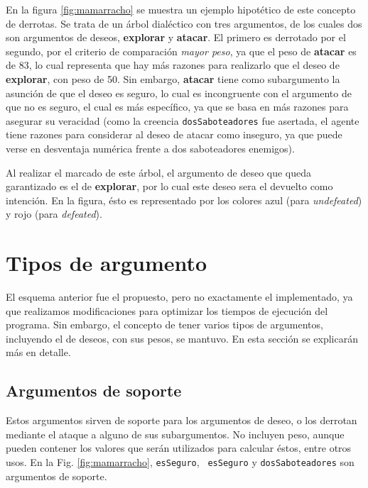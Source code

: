 \documentclass[oneside]{book}
\theoremstyle{definition}
\theoremstyle{example}
\begin{document}
En la figura \ref{fig:mamarracho} se muestra un ejemplo hipotético de este 
concepto de derrotas. Se 
trata de un árbol dialéctico con tres argumentos, de los cuales dos son
argumentos de deseos, \textbf{explorar} y \textbf{atacar}. El primero es
derrotado por el segundo, por el criterio de comparación \textit{mayor peso},
ya que el peso de \textbf{atacar} es de 83, lo cual representa que hay más 
razones para realizarlo que el deseo de \textbf{explorar}, con peso de 50. Sin
embargo, \textbf{atacar} tiene como subargumento la asunción de que el deseo es
seguro, lo cual es incongruente con el argumento de que no es seguro, el cual 
es más específico, ya que se basa en más razones para asegurar su veracidad 
(como la creencia \texttt{dosSaboteadores} fue asertada, el agente tiene 
razones para considerar al deseo de atacar como inseguro, ya que puede verse
en desventaja numérica frente a dos saboteadores enemigos).

Al realizar el marcado de este árbol, el argumento de deseo que queda 
garantizado es el de \textbf{explorar}, por lo cual este deseo sera el devuelto
como intención. En la figura, ésto es representado por los colores azul (para
\textit{undefeated}) y rojo (para \textit{defeated}).


\section{Tipos de argumento}

\label{sec:tiposArgumento}


El esquema anterior fue el propuesto, pero no exactamente el implementado, ya que
realizamos modificaciones para optimizar los tiempos de ejecución del programa. Sin 
embargo, el concepto de tener varios tipos de argumentos, incluyendo el de deseos, con sus
pesos, se mantuvo. En esta sección se explicarán más en detalle.

\subsection{Argumentos de soporte}

\label{sec:argumentosSoporte}

Estos argumentos sirven de soporte para los argumentos de deseo, o los derrotan mediante
el ataque a alguno de sus subargumentos. 
No incluyen peso, aunque pueden contener los valores que serán utilizados para calcular 
éstos, entre otros usos. En la Fig. \ref{fig:mamarracho}, \texttt{esSeguro}, 
\texttt{~esSeguro} y \texttt{dosSaboteadores} son argumentos de soporte.
\end{document}
